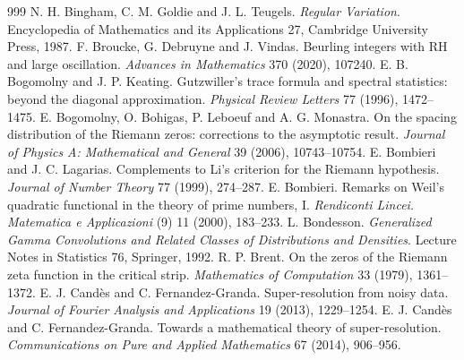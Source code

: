 \begin{thebibliography}{999}
 N. H. Bingham, C. M. Goldie and J. L. Teugels. \emph{Regular Variation}. Encyclopedia of Mathematics and its Applications 27, Cambridge University Press, 1987.
 F. Broucke, G. Debruyne and J. Vindas. Beurling integers with RH and large oscillation. \emph{Advances in Mathematics} 370 (2020), 107240.
 E. B. Bogomolny and J. P. Keating. Gutzwiller's trace formula and spectral statistics: beyond the diagonal approximation. \emph{Physical Review Letters} 77 (1996), 1472--1475.
 E. Bogomolny, O. Bohigas, P. Leboeuf and A. G. Monastra. On the spacing distribution of the Riemann zeros: corrections to the asymptotic result. \emph{Journal of Physics A: Mathematical and General} 39 (2006), 10743--10754.
 E. Bombieri and J. C. Lagarias. Complements to Li's criterion for the Riemann hypothesis. \emph{Journal of Number Theory} 77 (1999), 274--287.
 E. Bombieri. Remarks on Weil's quadratic functional in the theory of prime numbers, I. \emph{Rendiconti Lincei. Matematica e Applicazioni} (9) 11 (2000), 183--233.
 L. Bondesson. \emph{Generalized Gamma Convolutions and Related Classes of Distributions and Densities}. Lecture Notes in Statistics 76, Springer, 1992.
 R. P. Brent. On the zeros of the Riemann zeta function in the critical strip. \emph{Mathematics of Computation} 33 (1979), 1361--1372.
 E. J. Cand\`es and C. Fernandez-Granda. Super-resolution from noisy data. \emph{Journal of Fourier Analysis and Applications} 19 (2013), 1229--1254.
 E. J. Cand\`es and C. Fernandez-Granda. Towards a mathematical theory of super-resolution. \emph{Communications on Pure and Applied Mathematics} 67 (2014), 906--956.

\end{thebibliography}
